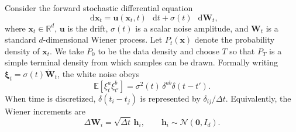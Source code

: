 \documentclass[11pt]{article}
\newcommand{\vct}[1]{\bm{#1}}
\newcommand{\dd}{\mathop{}\!\mathrm{d}}
\begin{document}
Consider the forward stochastic differential equation
\begin{equation}
    \dd\vct{x}_t
    = \vct{u}(\vct{x}_t,t)\,\dd t + \sigma(t)\,\dd\vct{W}_t,
    \label{eq:forward-sde}
\end{equation}
where \(\vct{x}_t\in\mathbb{R}^d\), \(\vct{u}\) is the drift, \(\sigma(t)\) is a
scalar noise amplitude, and \(\vct{W}_t\) is a standard \(d\)-dimensional Wiener
process. Let \(P_t(\vct{x})\) denote the probability density of \(\vct{x}_t\).
We take \(P_0\) to be the data density and choose \(T\) so that \(P_T\) is a
simple terminal density from which samples can be drawn.
Formally writing \(\vct{\xi}_t=\sigma(t)\dot{\vct{W}}_t\), the white noise obeys
\begin{equation}
    \mathbb{E}\!\left[\xi_t^a\xi_{t'}^b\right]
    = \sigma^2(t)\,\delta^{ab}\delta(t-t').
\end{equation}
When time is discretized, \(\delta(t_i-t_j)\) is represented by
\(\delta_{ij}/\Delta t\). Equivalently, the Wiener increments are
\begin{equation}
    \Delta\vct{W}_i=\sqrt{\Delta t}\,\vct{h}_i,
    \qquad \vct{h}_i\sim\mathcal{N}(\vct{0},I_d).
\end{equation}
\end{document}
